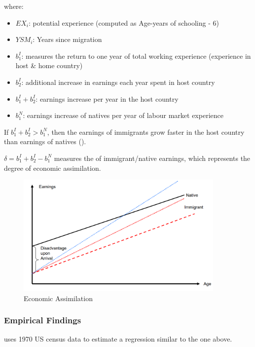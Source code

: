             where:
            
            \begin{itemize}
                \item $EX_i$: potential experience (computed as Age-years of schooling - 6)
                \item $YSM_i$: Years since migration
                \item $b_1^I$: measures the return to one year of total working experience (experience in host \& home country)
                \item $b_2^I$: additional increase in earnings each year spent in host country
                \item $b_1^I+b_2^I$: earnings increase per year in the host country
                \item $b_1^N$: earnings increase of natives per year of labour market experience
            \end{itemize}

            If $b_1^I+b_2^I > b_1^N$, then the earnings of immigrants grow faster in the host country than earnings of natives ().
            
            $\delta=b_1^I+b_2^I-b_1^N$ measures the  of immigrant/native earnings, which represents the degree of economic assimilation.

            \begin{figure}[H]
                \centering
                \includegraphics[width=4in]{images/ch11/13.png}
                \caption{Economic Assimilation}
            \end{figure}

        \subsubsection{Empirical Findings}

            \cite{chiswick_effect_1978} uses 1970 US census data to estimate a regression similar to the one above.
            
